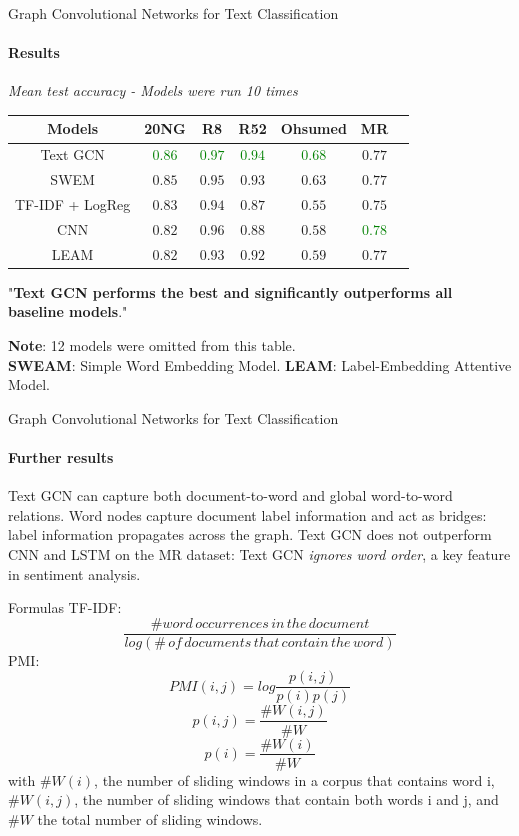 \documentclass{beamer}
\begin{document}
\begin{darkframes}
    \begin{frame}[label=lists]{\large{Graph Convolutional Networks for Text Classification}}
        \framesubtitle{Results}
        \footnotesize{
        \centering\caption{\textit{Mean test accuracy - Models were run 10 times}}
        \begin{center}
        \begin{tabular}{ c c c c c c c }
         Models & 20NG & R8 & R52 & Ohsumed & MR \\
         \hline
         Text GCN & \textcolor{green}{$0.86$} & \textcolor{green}{$0.97$} & \textcolor{green}{$0.94$} & \textcolor{green}{$0.68$} & $0.77$ \\
         SWEM & $0.85$ & $0.95$ & $0.93$ & $0.63$ & $0.77$ \\
         TF-IDF + LogReg & $0.83$ & $0.94$ & $0.87$ & $0.55$ & $0.75$ \\
         CNN & $0.82$ & $0.96$ & $0.88$ & $0.58$ & \textcolor{green}{$0.78$} \\
         LEAM & $0.82$ & $0.93$ & $0.92$ & $0.59$ & $0.77$ 
        \end{tabular}
        \end{center}}
        \centering"\textbf{Text GCN performs the best and significantly outperforms all baseline models}."\\
        
        \clearpage
        \raggedright\tiny{\textbf{Note}: 12 models were omitted from this table. \\\textbf{SWEAM}: Simple Word Embedding Model. \textbf{LEAM}: Label-Embedding Attentive Model.}
    \end{frame}
    
    \begin{frame}[label=lists]{\large{Graph Convolutional Networks for Text Classification}}
        \framesubtitle{Further results}
        \centering Text GCN can capture both document-to-word and global word-to-word relations.
        \clearpage
        \centering Word nodes capture document label information and act as bridges: label information propagates across the graph.
        \clearpage
        \centering Text GCN does not outperform CNN and LSTM on the MR dataset: Text GCN \textit{ignores word order}, a key feature in sentiment analysis.
        \clearpage
    \end{frame}

    \begin{frame}[label=lists]{\large{Formulas}}
        TF-IDF:
        $$\frac{{\# word\,occurrences\,in\,the\,document}}{log({\#\,of\,documents\,that\,contain\,the\,word})}$$
        PMI:
        \footnotesize{$${PMI}(i, j) = {log}\frac{p(i, j)}{p(i)p(j)}$$
        $$p(i, j) = \frac{\#W(i, j)}{\#W}$$
        $$p(i) = \frac{\#W(i)}{\#W}$$
        with $\#W(i)$, the number of sliding windows in a corpus that contains word i, $\#W(i, j)$, the number of sliding windows that contain both words i and j, and $\#W$ the total number of sliding windows.}
    \end{frame}


\end{darkframes}
\end{document}
